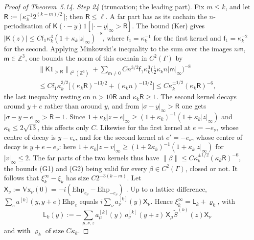 \documentclass[11pt]{amsart}
\theoremstyle{definition}
\begin{document}
\begin{proof}[Proof of Theorem~5.14]
\emph{Step 24} (truncation; the leading part).
Fix $m\le k$, and let $\mathsf R:=\lceil\kappa_k^{-1}2^{(k-m)/2}\rceil$; then $\mathsf R\le\ell$.
A far part has as its cochain the $n$-periodisation of $\mathsf K(\cdot-y)1[|\cdot-y|_\infty>\mathsf R]$.
The bound (Ker) gives $|\mathsf K(z)|\le C\mathsf f_1\kappa_k^3(1+\kappa_k|z|_\infty)^{-8}$, where $\mathsf f_1=\kappa_k^{-1}$ for the first kernel and $\mathsf f_1=\kappa_k^{-2}$ for the second.
Applying Minkowski's inequality to the sum over the images $n\mathsf m$, $\mathsf m\in\mathbb Z^3$, one bounds the norm of this cochain in $C^2(\Gamma)$ by
\begin{multline*}
\|\mathsf K1_{>\mathsf R}\|_{\ell^2(\mathbb Z^3)}+\sum_{\mathsf m\ne0}Cn^{3/2}\mathsf f_1\kappa_k^3\bigl(\tfrac12\kappa_kn|\mathsf m|_\infty\bigr)^{-8}\\
\le C\mathsf f_1\kappa_k^{3/2}\bigl[(\kappa_k\mathsf R)^{-13/2}+(\kappa_kn)^{-13/2}\bigr]\le C\kappa_k^{\pm1/2}(\kappa_k\mathsf R)^{-6},
\end{multline*}
the last inequality resting on $n>10\mathsf R$ and $\kappa_k\mathsf R\ge1$.
The second kernel decays around $y+e$ rather than around $y$, and from $|\sigma-y|_\infty>\mathsf R$ one gets $|\sigma-y-e|_\infty>\mathsf R-1$.
Since $1+\kappa_k|z-e|_\infty\ge(1+\kappa_k)^{-1}(1+\kappa_k|z|_\infty)$ and $\kappa_k\le2\sqrt{13}$, this affects only $C$.
Likewise for the first kernel at $e=-e_\nu$, whose centre of decay is $y-e_\nu$, and for the second kernel at $e'=-e_\nu$, whose centre of decay is $y+e-e_\nu$: here $1+\kappa_k|z-v|_\infty\ge(1+2\kappa_k)^{-1}(1+\kappa_k|z|_\infty)$ for $|v|_\infty\le2$.
The far parts of the two kernels thus have $\|\beta\|\le C\kappa_k^{\pm1/2}(\kappa_k\mathsf R)^{-6}$, the bounds (G1) and (G2) being valid for every $\beta\in C^2(\Gamma)$, closed or not.
It follows that $\xi_k^\infty-\xi_k$ has size $C2^{-3(k-m)}$.
Let $\mathsf X_\nu:=\allowbreak \mathrm{Vx}_\nu(0)=\allowbreak -i(\mathrm{Ehp}_{e_\nu}-\mathrm{Ehp}_{-e_\nu})$ \cite[Proposition~37.1\,(d)]{QEDIII}.
Up to a lattice difference, $\sum_ea^{[k]}(y,y+e)\mathrm{Ehp}_e$ equals $i\sum_\nu a^{[k]}_\nu(y)\mathsf X_\nu$.
Hence $\xi_k^\infty=\mathsf L_k+\varrho_k$, with
\begin{equation*}
\mathsf L_k(y):=-\sum_{\mu,\nu,z}a^{[k]}_\mu(y)\,a^{[k]}_\nu(y+z)\,\mathsf X_\mu\tilde S^{(k)}(z)\mathsf X_\nu
\end{equation*}
and with $\varrho_k$ of size $C\kappa_k$.


\end{proof}
\end{document}
